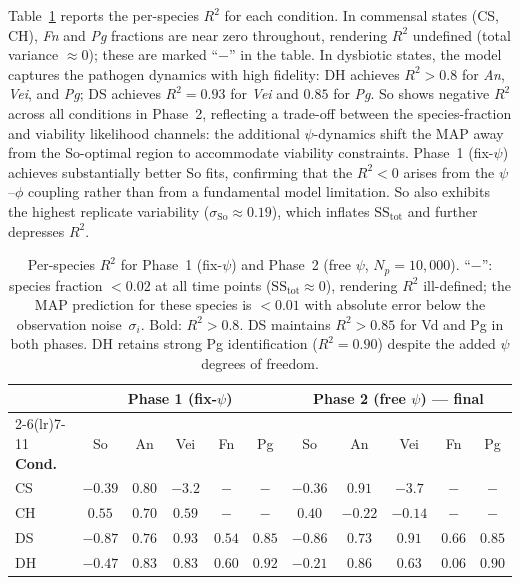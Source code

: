 \documentclass[11pt,a4paper]{article}
\begin{document}
Table~\ref{tab:r2_species} reports the per-species $R^2$ for each condition.
In commensal states (CS, CH), \textit{Fn} and \textit{Pg} fractions are near zero throughout, rendering $R^2$ undefined (total variance $\approx0$); these are marked ``$-$'' in the table.
In dysbiotic states, the model captures the pathogen dynamics with high fidelity: DH achieves $R^2>0.8$ for \textit{An}, \textit{Vei}, and \textit{Pg}; DS achieves $R^2=0.93$ for \textit{Vei} and $0.85$ for \textit{Pg}.
So shows negative $R^2$ across all conditions in Phase~2, reflecting a trade-off between the species-fraction and viability likelihood channels: the additional $\psi$-dynamics shift the MAP away from the So-optimal region to accommodate viability constraints.
Phase~1 (fix-$\psi$) achieves substantially better So fits, confirming that the $R^2<0$ arises from the $\psi$--$\phi$ coupling rather than from a fundamental model limitation.
So also exhibits the highest replicate variability ($\sigma_{\mathrm{So}}\approx0.19$), which inflates $\mathrm{SS}_{\mathrm{tot}}$ and further depresses $R^2$.

\begin{table}[h!]
\centering\small
\begin{tabular}{@{}l ccccc ccccc@{}}
\toprule
& \multicolumn{5}{c}{\textbf{Phase 1 (fix-$\psi$)}} & \multicolumn{5}{c}{\textbf{Phase 2 (free $\psi$) --- final}}\\
\cmidrule(lr){2-6}\cmidrule(lr){7-11}
\textbf{Cond.} & So & An & Vei & Fn & Pg & So & An & Vei & Fn & Pg\\
\midrule
CS  & $-0.39$ & $0.80$ & $-3.2$ & $-$ & $-$ & $-0.36$ & $\mathbf{0.91}$ & $-3.7$ & $-$ & $-$\\
CH  & $0.55$  & $0.70$ & $0.59$  & $-$ & $-$ & $0.40$  & $-0.22$ & $-0.14$ & $-$ & $-$\\
DS  & $-0.87$ & $0.76$ & $\mathbf{0.93}$ & $0.54$ & $\mathbf{0.85}$ & $-0.86$ & $0.73$ & $\mathbf{0.91}$ & $0.66$ & $\mathbf{0.85}$\\
DH  & $-0.47$ & $\mathbf{0.83}$ & $\mathbf{0.83}$ & $0.60$ & $\mathbf{0.92}$ & $-0.21$ & $\mathbf{0.86}$ & $0.63$ & $0.06$ & $\mathbf{0.90}$\\
\bottomrule
\end{tabular}
\caption{Per-species $R^2$ for Phase~1 (fix-$\psi$) and Phase~2 (free $\psi$, $N_p=10{,}000$).
``$-$'': species fraction $<0.02$ at all time points ($\mathrm{SS}_{\mathrm{tot}}\approx0$), rendering $R^2$ ill-defined; the MAP prediction for these species is $<0.01$ with absolute error below the observation noise~$\sigma_i$.
Bold: $R^2>0.8$.
DS maintains $R^2>0.85$ for Vd and Pg in both phases. DH retains strong Pg identification ($R^2=0.90$) despite the added $\psi$ degrees of freedom.}
\label{tab:r2_species}
\end{table}
\end{document}
